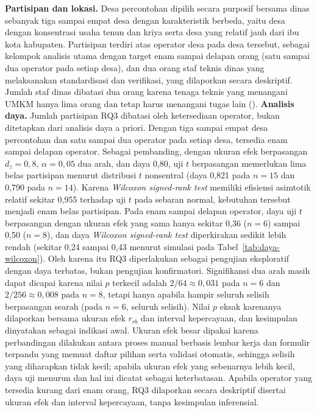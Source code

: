 \textbf{Partisipan dan lokasi.} Desa percontohan dipilih secara purposif bersama dinas sebanyak tiga sampai empat desa dengan karakteristik berbeda, yaitu desa dengan konsentrasi usaha tenun dan kriya serta desa yang relatif jauh dari ibu kota kabupaten. Partisipan terdiri atas operator desa pada desa tersebut, sebagai kelompok analisis utama dengan target enam sampai delapan orang (satu sampai dua operator pada setiap desa), dan dua orang staf teknis dinas yang melaksanakan standardisasi dan verifikasi, yang dilaporkan secara deskriptif. Jumlah staf dinas dibatasi dua orang karena tenaga teknis yang menangani UMKM hanya lima orang dan tetap harus menangani tugas lain (\lampstaf).
\textbf{Analisis daya.} Jumlah partisipan RQ3 dibatasi oleh ketersediaan operator, bukan ditetapkan dari analisis daya a priori. Dengan tiga sampai empat desa percontohan dan satu sampai dua operator pada setiap desa, tersedia enam sampai delapan operator. Sebagai pembanding, dengan ukuran efek berpasangan $d_z = 0{,}8$, $\alpha = 0{,}05$ dua arah, dan daya 0,80, uji $t$ berpasangan memerlukan lima belas partisipan menurut distribusi $t$ nonsentral (daya 0,821 pada $n = 15$ dan 0,790 pada $n = 14$). Karena \textit{Wilcoxon signed-rank test} memiliki efisiensi asimtotik relatif sekitar 0,955 terhadap uji $t$ pada sebaran normal, kebutuhan tersebut menjadi enam belas partisipan. Pada enam sampai delapan operator, daya uji $t$ berpasangan dengan ukuran efek yang sama hanya sekitar 0,36 ($n = 6$) sampai 0,50 ($n = 8$), dan daya \textit{Wilcoxon signed-rank test} diperkirakan sedikit lebih rendah (sekitar 0,24 sampai 0,43 menurut simulasi pada Tabel~\ref{tab:daya-wilcoxon}). Oleh karena itu RQ3 diperlakukan sebagai pengujian eksploratif dengan daya terbatas, bukan pengujian konfirmatori. Signifikansi dua arah masih dapat dicapai karena nilai $p$ terkecil adalah $2/64 \approx 0{,}031$ pada $n = 6$ dan $2/256 \approx 0{,}008$ pada $n = 8$, tetapi hanya apabila hampir seluruh selisih berpasangan searah (pada $n = 6$, seluruh selisih). Nilai $p$ eksak karenanya dilaporkan bersama ukuran efek $r_{rb}$ dan interval kepercayaan, dan kesimpulan dinyatakan sebagai indikasi awal. Ukuran efek besar dipakai karena perbandingan dilakukan antara proses manual berbasis lembar kerja dan formulir terpandu yang memuat daftar pilihan serta validasi otomatis, sehingga selisih yang diharapkan tidak kecil; apabila ukuran efek yang sebenarnya lebih kecil, daya uji menurun dan hal ini dicatat sebagai keterbatasan. Apabila operator yang tersedia kurang dari enam orang, RQ3 dilaporkan secara deskriptif disertai ukuran efek dan interval kepercayaan, tanpa kesimpulan inferensial.

